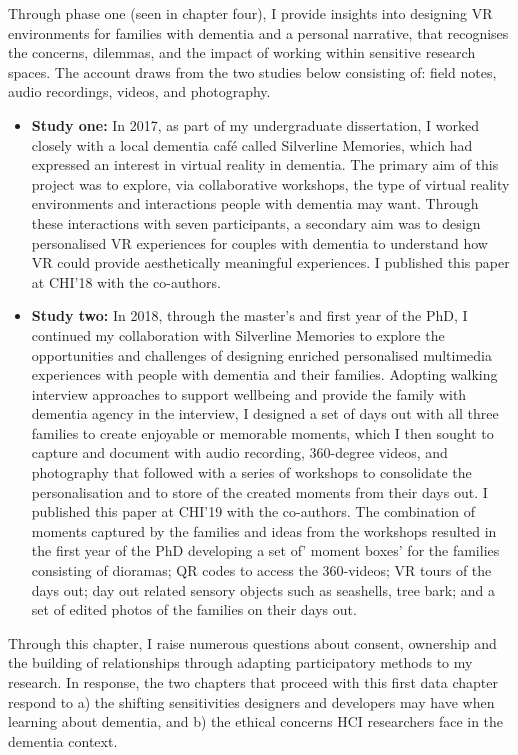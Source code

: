 Through phase one (seen in chapter four), I provide insights into designing VR environments for families with dementia and a personal narrative, that recognises the concerns, dilemmas, and the impact of working within sensitive research spaces. The account draws from the two studies below consisting of: field notes, audio recordings, videos, and photography. 
\begin{itemize}
    \item \textbf{Study one:} In 2017, as part of my undergraduate dissertation, I worked closely with a local dementia café called Silverline Memories, which had expressed an interest in virtual reality in dementia. The primary aim of this project was to explore, via collaborative workshops, the type of virtual reality environments and interactions people with dementia may want. Through these interactions with seven participants, a secondary aim was to design personalised VR experiences for couples with dementia to understand how VR could provide aesthetically meaningful experiences. I published this paper at CHI'18 with the co-authors.

    \item \textbf{Study two:} In 2018, through the master's and first year of the PhD, I continued my collaboration with Silverline Memories to explore the opportunities and challenges of designing enriched personalised multimedia experiences with people with dementia and their families. Adopting walking interview approaches to support wellbeing and provide the family with dementia agency in the interview, I designed a set of days out with all three families to create enjoyable or memorable moments, which I then sought to capture and document with audio recording, 360-degree videos, and photography that followed with a series of workshops to consolidate the personalisation and to store of the created moments from their days out. I published this paper at CHI'19 with the co-authors. The combination of moments captured by the families and ideas from the workshops resulted in the first year of the PhD developing a set of' moment boxes' for the families consisting of dioramas; QR codes to access the 360-videos; VR tours of the days out; day out related sensory objects such as seashells, tree bark; and a set of edited photos of the families on their days out.

\end{itemize}

Through this chapter, I raise numerous questions about consent, ownership and the building of relationships through adapting participatory methods to my research. In response, the two chapters that proceed with this first data chapter respond to a) the shifting sensitivities designers and developers may have when learning about dementia, and b) the ethical concerns HCI researchers face in the dementia context.

